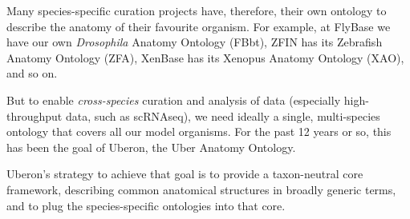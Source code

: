 \begin{frame}
{  Many species-specific curation projects have, therefore, their own ontology
  to describe the anatomy of their favourite organism. For example, at FlyBase
  we have our own \emph{Drosophila} Anatomy Ontology (FBbt), ZFIN has its
  Zebrafish Anatomy Ontology (ZFA), XenBase has its Xenopus Anatomy Ontology
  (XAO), and so on.

  But to enable \emph{cross-species} curation and analysis of data (especially
  high-throughput data, such as scRNAseq), we need ideally a single,
  multi-species ontology that covers all our model organisms. For the past 12
  years or so, this has been the goal of Uberon, the Uber Anatomy Ontology.

  Uberon's strategy to achieve that goal is to provide a taxon-neutral core
  framework, describing common anatomical structures in broadly generic terms,
  and to plug the species-specific ontologies into that core.}

\end{frame}

